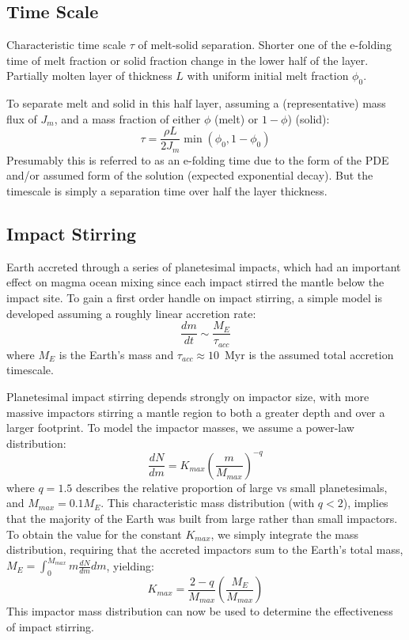\subsection{Time Scale}
Characteristic time scale $\tau$ of melt-solid separation.  Shorter one of the e-folding time of melt fraction or solid fraction change in the lower half of the layer.  Partially molten layer of thickness $L$ with uniform initial melt fraction $\phi_0$.

To separate melt and solid in this half layer, assuming a (representative) mass flux of $J_m$, and a mass fraction of either $\phi$ (melt) or $1-\phi$) (solid):
\begin{equation}
\tau = \frac{\rho L}{2 J_m} \min (\phi_0, 1-\phi_0 )
\end{equation}
Presumably this is referred to as an e-folding time due to the form of the PDE and/or assumed form of the solution (expected exponential decay).  But the timescale is simply a separation time over half the layer thickness.

\subsection{Impact Stirring}

Earth accreted through a series of planetesimal impacts, which had an important effect on magma ocean mixing since each impact stirred the mantle below the impact site.
To gain a first order handle on impact stirring, a simple model is developed assuming a roughly linear accretion rate:
\begin{equation}
\frac{dm}{dt} \sim \frac{M_E}{\tau_{acc}}
\label{eq:abe1993_accrate}
\end{equation}
where $M_E$ is the Earth's mass and $\tau_{acc} \approx 10$~Myr is the assumed total accretion timescale.

Planetesimal impact stirring depends strongly on impactor size, with more massive impactors stirring a mantle region to both a greater depth and over a larger footprint.
To model the impactor masses, we assume a power-law distribution:
\begin{equation}
  \frac{dN}{dm} = {K_{max}\left(\frac{m}{M_{max}}\right)^{-q}}
\end{equation}
where $q=1.5$ describes the relative proportion of large vs small planetesimals, and $M_{max}=0.1 M_E$.
This characteristic mass distribution (with $q<2$), implies that the majority of the Earth was built from large rather than small impactors.
To obtain the value for the constant $K_{max}$, we simply integrate the mass distribution, requiring that the accreted impactors sum to the Earth's total mass, ${M_E = \int_0^{M_{max}} m \frac{dN}{dm}dm}$, yielding:
\begin{equation}
  K_{max} = \frac{2-q}{M_{max}}\left(\frac{M_E}{M_{max}}\right)
\end{equation}
This impactor mass distribution can now be used to determine the effectiveness of impact stirring.

